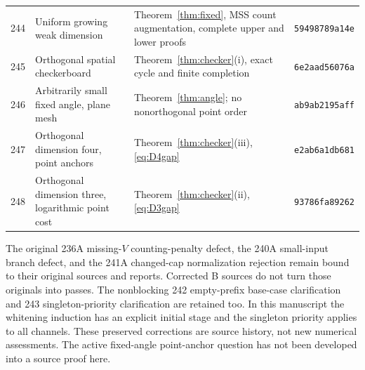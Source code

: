 \begin{longtable}{@{}p{}p{}p{}p{}@{}}
244 & Uniform growing weak dimension & Theorem~\ref{thm:fixed},
MSS count augmentation, complete upper and lower proofs & \texttt{59498789a14e}\\
245 & Orthogonal spatial checkerboard &
Theorem~\ref{thm:checker}(i), exact cycle and finite completion & \texttt{6e2aad56076a}\\
246 & Arbitrarily small fixed angle, plane mesh &
Theorem~\ref{thm:angle}; no nonorthogonal point order & \texttt{ab9ab2195aff}\\
247 & Orthogonal dimension four, point anchors &
Theorem~\ref{thm:checker}(iii), \eqref{eq:D4gap} & \texttt{e2ab6a1db681}\\
248 & Orthogonal dimension three, logarithmic point cost &
Theorem~\ref{thm:checker}(ii), \eqref{eq:D3gap} & \texttt{93786fa89262}\\
\bottomrule
\end{longtable}
\endgroup

The original 236A missing-$V$ counting-penalty defect, the 240A small-input
branch defect, and the 241A changed-cap normalization rejection remain bound
to their original sources and reports. Corrected B sources do not turn those
originals into passes. The nonblocking 242 empty-prefix base-case clarification
and 243 singleton-priority clarification are retained too. In this manuscript
the whitening induction has an explicit initial stage and the singleton
priority applies to all channels. These preserved corrections are source
history, not new numerical assessments. The active fixed-angle point-anchor
question has not been developed into a source proof here.

